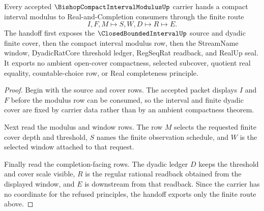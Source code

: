 \begin{theorem}
\label{thm:bishop-compact-interval-modulus-completion-handoff}
Every accepted $\BishopCompactIntervalModulusUp$ carrier hands a compact interval modulus to Real-and-Completion consumers through the finite route
$$
I,F,M \longmapsto S,W,D \longmapsto R \longmapsto E .
$$
The handoff first exposes the $\ClosedBoundedIntervalUp$ source and dyadic finite cover, then the compact interval modulus row, then the StreamName window, DyadicRatCore threshold ledger, RegSeqRat readback, and RealUp seal. It exports no ambient open-cover compactness, selected subcover, quotient real equality, countable-choice row, or Real completeness principle.
\end{theorem}
\begin{proof}
Begin with the source and cover rows. The accepted packet displays $I$ and $F$ before the modulus row can be consumed, so the interval and finite dyadic cover are fixed by carrier data rather than by an ambient compactness theorem.

Next read the modulus and window rows. The row $M$ selects the requested finite cover depth and threshold, $S$ names the finite observation schedule, and $W$ is the selected window attached to that request.

Finally read the completion-facing rows. The dyadic ledger $D$ keeps the threshold and cover scale visible, $R$ is the regular rational readback obtained from the displayed window, and $E$ is downstream from that readback. Since the carrier has no coordinate for the refused principles, the handoff exports only the finite route above.
\end{proof}



